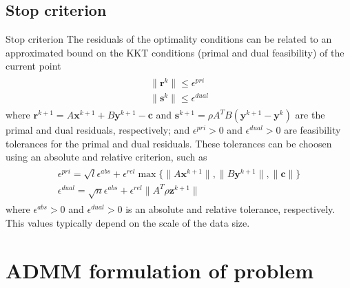 \documentclass[8pt,red]{beamer}
\theoremstyle{plain}
\theoremstyle{definition}
\theoremstyle{remark}
\newcommand{\bi}[1]{\ensuremath{\boldsymbol{#1}}}
\begin{document}
\subsection{Stop criterion}
\begin{frame}{Stop criterion}
The residuals of the optimality conditions can be related to an approximated bound on the KKT conditions (primal and dual feasibility) of the current point
\begin{align}
\begin{array}{l}
  \| \bi{r}^{k} \| \leq \epsilon^{pri} \\
  \| \bi{s}^{k} \| \leq \epsilon^{dual}  
\end{array} \label{eq.stopcriterion}
\end{align}
where $\bi{r}^{k+1} = A \bi{x}^{k+1} + B \bi{y}^{k+1} - \bi{c}$ and $\bi{s}^{k+1} = \rho A^{T} B \left( \bi{y}^{k+1} - \bi{y}^{k} \right)$ are the primal and dual residuals, respectively; and $\epsilon^{pri} > 0$ and $\epsilon^{dual} > 0$ are feasibility tolerances for the primal and dual residuals. These tolerances can be choosen using an absolute and relative criterion, such as
\begin{align}
\begin{array}{l}
  \epsilon^{pri} = \sqrt{l} \epsilon^{abs} + \epsilon^{rel} \max \lbrace \|A \bi{x}^{k+1}\|,\|B \bi{y}^{k+1}\|, \|\bi{c}\|  \rbrace \\
  \epsilon^{dual} = \sqrt{n} \epsilon^{abs} + \epsilon^{rel} \|A^{T} \rho \bi{z}^{k+1}\| 
\end{array}
\end{align}
where $\epsilon^{abs} > 0$ and $\epsilon^{dual} > 0$ is an absolute and relative tolerance, respectively. This values typically depend on the scale of the data size.
\end{frame}

\section{ADMM formulation of problem}
\end{document}
